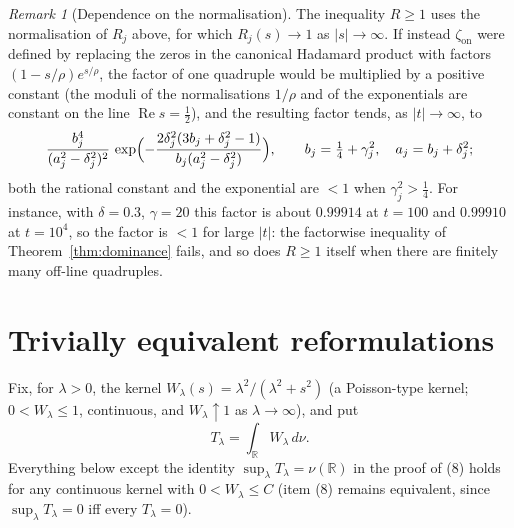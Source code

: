 \documentclass[11pt]{amsart}
\theoremstyle{definition}
\theoremstyle{remark}
\newtheorem{remark}[theorem]{Remark}
\renewcommand{\Re}{\operatorname{Re}}
\newcommand{\half}{\tfrac12}
\newcommand{\dnu}{d\nu}
\newcommand{\zon}{\zeta_{\mathrm{on}}}
\newcommand{\Tlam}{T_\lambda}
\newcommand{\Wlam}{W_\lambda}
\begin{document}
\begin{remark}[Dependence on the normalisation]\label{rem:normalisation}
The inequality $R\ge1$ uses the normalisation of $R_j$ above, for which $R_j(s)\to1$ as
$|s|\to\infty$. If instead $\zon$ were defined by replacing the zeros in the canonical Hadamard
product with factors $(1-s/\rho)e^{s/\rho}$, the factor of one quadruple would be multiplied by
a positive constant (the moduli of the normalisations $1/\rho$ and of the exponentials are
constant on the line $\Re s=\half$), and the resulting factor tends, as $|t|\to\infty$, to
\[
\frac{b_j^4}{(a_j^2-\delta_j^2)^2}\,
\exp\Bigl(-\frac{2\delta_j^2(3b_j+\delta_j^2-1)}{b_j(a_j^2-\delta_j^2)}\Bigr),\qquad
b_j=\tfrac14+\gamma_j^2,\quad a_j=b_j+\delta_j^2;
\]
both the rational constant and the exponential are $<1$ when $\gamma_j^2>\tfrac14$. For instance, with $\delta=0.3$, $\gamma=20$ this factor is
about $0.99914$ at $t=100$ and $0.99910$ at $t=10^4$, so the factor is $<1$ for large $|t|$: the factorwise inequality of Theorem~\ref{thm:dominance} fails, and so does $R\ge1$ itself when there are finitely many off-line quadruples.
\end{remark}

\section{Trivially equivalent reformulations}\label{sec:eight}

Fix, for $\lambda>0$, the kernel $\Wlam(s)=\lambda^2/(\lambda^2+s^2)$ (a Poisson-type kernel;
$0<\Wlam\le1$, continuous, and $\Wlam\uparrow1$ as $\lambda\to\infty$), and put
\[
\Tlam=\int_{\mathbb R}\Wlam\,\dnu .
\]
Everything below except the identity $\sup_\lambda\Tlam=\nu(\mathbb R)$ in the proof of (8)
holds for any continuous kernel with $0<\Wlam\le C$ (item (8) remains equivalent, since
$\sup_\lambda\Tlam=0$ iff every $\Tlam=0$).
\end{document}
